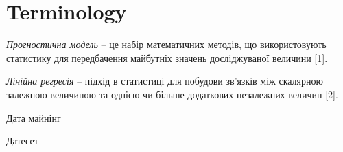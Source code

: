 \section{Terminology}
\textit{Прогностична модель} – це набір математичних методів, що використовують статистику для передбачення майбутніх значень досліджуваної величини [1]. 

\textit{Лінійна регресія} – підхід в статистиці для побудови зв’язків між скалярною залежною величиною та однією чи більше додаткових незалежних величин [2].

Дата майнінг

Датесет

